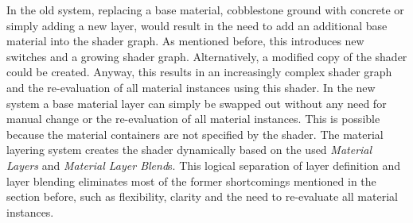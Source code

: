 In the old system, replacing a base material, cobblestone ground with concrete or simply adding a new layer, would result in the need to add an additional base material into the shader graph. As mentioned before, this introduces new switches and a growing shader graph. Alternatively, a modified copy of the shader could be created. Anyway, this results in an increasingly complex shader graph and the re-evaluation of all material instances using this shader. 
In the new system a base material layer can simply be swapped out without any need for manual change or the re-evaluation of all material instances. This is possible because the material containers are not specified by the shader. The material layering system creates the shader dynamically based on the used\emph{ Material Layers} and \emph{Material Layer Blend}s. This logical separation of layer definition and layer blending eliminates most of the former shortcomings mentioned in the section before, such as flexibility, clarity  and the need to re-evaluate all material instances. 


